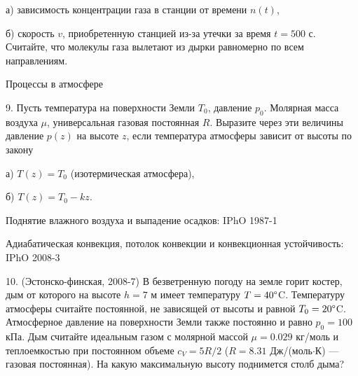 \documentclass[14pt]{article}
\begin{document}
а) зависимость концентрации газа в станции от времени $n(t)$,

б) скорость $v$, приобретенную станцией из-за утечки за время $t=500$ с. Считайте, что молекулы газа вылетают из дырки равномерно по всем направлениям.


\vspace{5mm}
{\large{Процессы в атмосфере}}
\vspace{3mm}

9. Пусть температура на поверхности Земли $T_0$, давление $p_0$. Молярная масса воздуха $\mu$, универсальная газовая постоянная $R$. Выразите через эти величины давление $p(z)$ на высоте $z$, если температура атмосферы зависит от высоты по закону

а) $T(z)=T_0$ (изотермическая атмосфера),

б) $T(z)=T_0-kz$.

Поднятие влажного воздуха и выпадение осадков: IPhO 1987-1

Адиабатическая конвекция, потолок конвекции и конвекционная устойчивость: IPhO 2008-3

10. (Эстонско-финская, 2008-7) В безветренную погоду на земле горит костер, дым от которого на высоте $h=7$ м имеет температуру $T=40\degree$C. Температуру атмосферы считайте постоянной, не зависящей от высоты и равной $T_0=20\degree$C. Атмосферное давление на поверхности Земли также постоянно и равно $p_0=100$ кПа. Дым считайте идеальным газом с молярной массой $\mu=0.029$ кг/моль и теплоемкостью при постоянном объеме $c_V=5R/2$ ($R=8.31$ Дж/(моль$\cdot$К) --- газовая постоянная). На какую максимальную высоту поднимется столб дыма?
\end{document}
